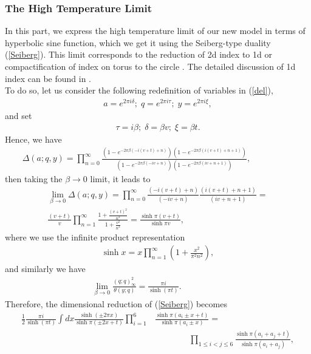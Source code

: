 \documentclass[a4paper,11pt]{article}%
\numberwithin{equation}{section}
\begin{document}
\subsubsection{The High Temperature Limit}\label{ht}
In this part, we express the high temperature limit of our new model  in terms of hyperbolic sine function, which we get it using the Seiberg-type duality (\ref{Seiberg}). This limit  corresponds to the reduction of 2d index to 1d or  compactification of index on torus to the circle \cite{Yamazaki:2015voa}. The detailed discussion of 1d index can be found in \cite{Hori:2014tda, Cordova:2014oxa}.\\To do so, let us consider the following  redefinition of variables in (\ref{del}),
\begin{align}
  a=e^{2\pi i \delta};\; q=e^{2\pi i \tau};\; y=e^{2\pi i \xi},
\end{align}
and set 
\begin{align}
  \tau=i\beta;\; \delta=\beta v;\; \xi= \beta t.
\end{align}
Hence, we have
\begin{align}\label{Deltanew}
 \Delta(a;q,y) = \prod_{n=0}^{\infty} \frac{(1-e^{-2\pi\beta(-i(v+t)+n)})(1-e^{-2\pi\beta(i(v+t)+n+1)})}{(1-e^{-2\pi\beta(-iv+n)})(1-e^{-2\pi\beta(iv+n+1)})},\qquad\qquad\quad
\end{align}
then taking the  $\beta\rightarrow0$ limit, it leads to
\begin{align}
\lim_{\beta \to 0} \Delta(a;q,y)=  \prod_{n=0}^{\infty} \frac{(-i(v+t)+n)}{(-iv+n)} \frac{(i(v+t)+n+1)}{(iv+n+1)}= \\ \nonumber
\frac{(v+t)}{ v} \prod_{n=1}^{\infty} \frac{1+\frac{(v+t)^2}{n^2}}{1+\frac{v^2}{n^2}} =
\frac{\sinh\pi(v+t)}{\sinh\pi v},
\end{align}
where we use the infinite product representation 
\begin{align}
  \sinh x=x\prod_{n=1}^{\infty}(1+\frac{x^2}{\pi^2n^2}),
\end{align}
and similarly we have
\begin{align}
     \lim_{\beta \to 0} \frac{(q;q)^2_{\infty}}{\theta(y;q)}=\frac{\pi i}{\sinh(\pi t)}.\qquad\qquad\quad
\end{align}
Therefore, the dimensional reduction of (\ref{Seiberg}) becomes
\begin{align}\label{sinhstr}\nonumber
  \frac 12 \frac{\pi i}{\sinh(\pi t)} \int dx \frac{\sinh(\pm 2\pi x) }{\sinh \pi(\pm 2x+t)}\prod_{i=1}^{6} &\frac{\sinh\pi (a_i\pm x+t) }{\sinh \pi(a_i\pm x)}=\\&\qquad\qquad\prod_{1\leq i<j\leq6}\frac{\sinh\pi(a_i+a_j+t)}{\sinh\pi(a_i+a_j)}, 
\end{align}
\end{document}
